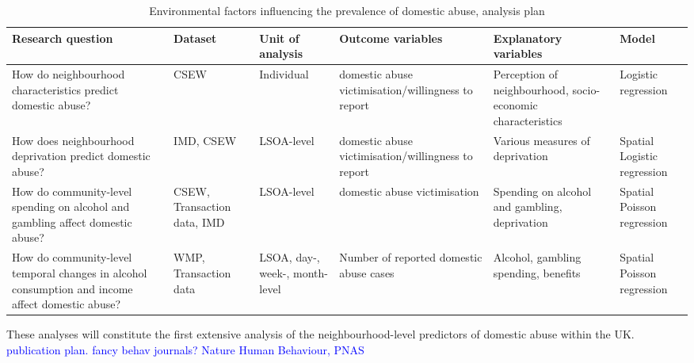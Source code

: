 \documentclass[11pt, a4paper]{article}
\newcommand{\AT}[1] {{\textcolor{blue}{#1}}}
\begin{document}
\begin{table}[!htbp]
\caption{Environmental factors influencing the prevalence of domestic abuse, analysis plan}
  \begin{threeparttable}[t]
  \centering
       \begin{tabular}{ L{4cm}  C{1.2cm}  C{1.6cm}  C{3cm}  C{2.8cm}  C{1.8cm} }
    \toprule
     \textbf{Research question} & \textbf{Dataset}    & \textbf{Unit of analysis} & \textbf{Outcome variables} & \textbf{Explanatory variables} & \textbf{Model} \\
    \midrule
    How do neighbourhood characteristics predict domestic abuse? & CSEW & Individual & domestic abuse victimisation/willingness to report & Perception of neighbourhood, socio-economic characteristics & Logistic regression \\
         \midrule
          How does neighbourhood deprivation predict domestic abuse? & IMD, CSEW & LSOA-level & domestic abuse victimisation/willingness to report & Various measures of deprivation & Spatial Logistic regression \\
         \midrule
          How do community-level spending on alcohol and gambling affect domestic abuse? & CSEW, Transaction data, IMD & LSOA-level & domestic abuse victimisation & Spending on alcohol and gambling, deprivation & Spatial Poisson regression \\
         \midrule
    How do community-level temporal changes in alcohol consumption and income affect domestic abuse? & WMP, Transaction data & LSOA, day-, week-, month-level & Number of reported domestic abuse cases & Alcohol, gambling spending, benefits & Spatial Poisson regression \\

     \bottomrule
  \end{tabular}
    \end{threeparttable}%
  \label{tab:addlabel}%
\end{table}%

These analyses will constitute the first extensive analysis of the neighbourhood-level predictors of domestic abuse within the UK. \AT{publication plan. fancy behav journals? Nature Human Behaviour, PNAS}

\newpage

%
%
%
%
%
%
%
%
%
\end{document}
